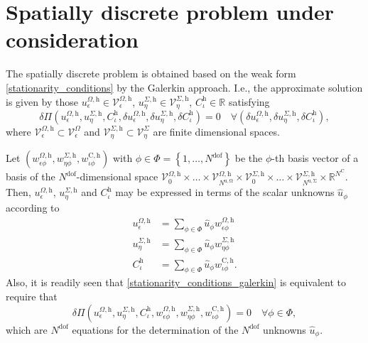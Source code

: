 \documentclass[pdftex,a4paper,12pt,abstracton]{scrartcl}
\begin{document}
\section{Spatially discrete problem under consideration}
The spatially discrete problem is obtained based on the weak form \eqref{stationarity_conditions} by the Galerkin approach. I.e., the approximate solution is given by those $u^{\Omega,\mathrm{h}}_\epsilon \in \mathcal{V}^{\Omega,\mathrm{h}}_\epsilon$, $u^{\Sigma,\mathrm{h}}_\eta \in \mathcal{V}^{\Sigma,\mathrm{h}}_\eta$, $C^\mathrm{h}_\iota \in \mathbb{R}$ satisfying
\begin{equation}
  \delta \Pi(u^{\Omega,\mathrm{h}}_\epsilon, u^{\Sigma,\mathrm{h}}_\eta, C^\mathrm{h}_\iota, \delta u^{\Omega,\mathrm{h}}_\epsilon, \delta u^{\Sigma,\mathrm{h}}_\eta, \delta C^\mathrm{h}_\iota)
  = 0
  \quad \forall (\delta u^{\Omega,\mathrm{h}}_\epsilon, \delta u^{\Sigma,\mathrm{h}}_\eta, \delta C^\mathrm{h}_\iota),
  \label{stationarity_conditions_galerkin}
\end{equation}
where $\mathcal{V}^{\Omega,\mathrm{h}}_\epsilon \subset \mathcal{V}^\Omega_\epsilon$ and $\mathcal{V}^{\Sigma,\mathrm{h}}_\eta \subset \mathcal{V}^\Sigma_\eta$ are finite dimensional spaces.

Let $(w^{\Omega,\mathrm{h}}_{\epsilon \phi}, w^{\Sigma,\mathrm{h}}_{\eta \phi}, w^{\mathrm{C},\mathrm{h}}_{\iota \phi})$ with $\phi \in \Phi=\left\{1, \hdots, N^\mathrm{dof} \right\}$ be the $\phi$-th basis vector of a basis of the $N^\mathrm{dof}$-dimensional space $\mathcal{V}^{\Omega,\mathrm{h}}_0 \times \hdots \times \mathcal{V}^{\Omega,\mathrm{h}}_{N^\mathrm{u,\Omega}} \times \mathcal{V}^{\Sigma,\mathrm{h}}_0 \times \hdots \times \mathcal{V}^{\Sigma,\mathrm{h}}_{N^\mathrm{u,\Sigma}} \times \mathbb{R}^{N^\mathrm{C}}$.
Then, $u^{\Omega,\mathrm{h}}_\epsilon$, $u^{\Sigma,\mathrm{h}}_\eta$ and $C^\mathrm{h}_\iota$ may be expressed in terms of the scalar unknowns $\hat u_\phi$ according to
\begin{equation}
\begin{split}
u^{\Omega,\mathrm{h}}_\epsilon &= \sum_{\phi \in \Phi} \hat u_\phi w^{\Omega,\mathrm{h}}_{\epsilon\phi}\\
u^{\Sigma,\mathrm{h}}_\eta &= \sum_{\phi \in \Phi} \hat u_\phi w^{\Sigma,\mathrm{h}}_{\eta\phi}\\
C^\mathrm{h}_\iota &= \sum_{\phi \in \Phi} \hat u_\phi w^{\mathrm{C},\mathrm{h}}_{\iota\phi}.
\end{split}
\end{equation}
Also, it is readily seen that \eqref{stationarity_conditions_galerkin} is equivalent to require that
\begin{equation}
  \delta \Pi(u^{\Omega,\mathrm{h}}_\epsilon, u^{\Sigma,\mathrm{h}}_\eta, C^\mathrm{h}_\iota, w^{\Omega,\mathrm{h}}_{\epsilon\phi}, w^{\Sigma,\mathrm{h}}_{\eta\phi}, w^{\mathrm{C},\mathrm{h}}_{\iota\phi})
  = 0
  \quad \forall \phi \in \Phi,
  \label{stationarity_conditions_discrete}
\end{equation}
which are $N^\mathrm{dof}$ equations for the determination of the $N^\mathrm{dof}$ unknowns $\hat u_\phi$.
\end{document}
